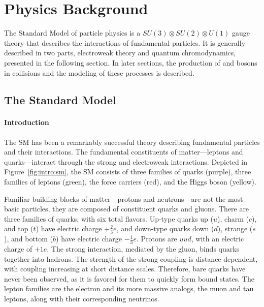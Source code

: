 \chapter{Physics Background}\label{ch:sm}
The Standard Model of particle physics is a $SU(3)\otimes SU(2)\otimes U(1)$ gauge theory that describes the interactions of fundamental particles. It is generally described in two parts, electroweak theory and quantum chromodynamics, presented in the following section. In later sections, the production of \W and \Z bosons in \pp collisions and the modeling of these processes is described. 



\section{The Standard Model}\label{ch:sm:sm}
\subsubsection{Introduction}
The SM has been a remarkably successful theory describing fundamental particles and their interactions. The fundamental constituents of matter---leptons and quarks---interact through the strong and electroweak interactions. Depicted in Figure~\ref{fig:intro:sm}, the SM consists of three families of quarks (purple), three families of leptons (green), the force carriers (red), and the Higgs boson (yellow). 



Familiar building blocks of matter---protons and neutrons---are not the most basic particles, they are composed of constituent quarks and gluons. There are three families of quarks, with six total flavors. Up-type quarks up ($u$), charm ($c$), and top ($t$) have electric charge $+\frac{2}{3} e$, and down-type quarks down ($d$), strange ($s$), and bottom ($b$) have electric charge $-\frac{1}{3}e$. Protons are $uud$, with an electric charge of $+1e$. The strong interaction, mediated by the gluon, binds quarks together into hadrons. The strength of the strong coupling is distance-dependent, with coupling increasing at short distance scales. Therefore, bare quarks have never been observed, as it is favored for them to quickly form bound states. The lepton families are the electron and its more massive analogs, the muon and tau leptons, along with their corresponding neutrinos. 

